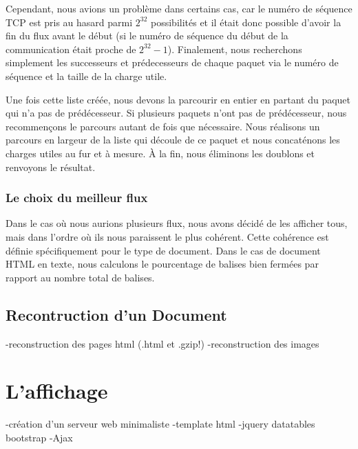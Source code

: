 Cependant, nous avions un problème dans certains cas, car le numéro de séquence TCP est pris au hasard parmi $2^{32}$ possibilités et il était donc possible d'avoir la fin du flux 
avant le début (si le numéro de séquence du début de la communication était proche de $2^{32} -1$). Finalement, nous recherchons simplement les successeurs et prédecesseurs de chaque
paquet via le numéro de séquence et la taille de la charge utile.

Une fois cette liste créée, nous devons la parcourir en entier en partant du paquet qui n'a pas de prédécesseur. Si plusieurs paquets n'ont pas de prédécesseur, nous recommençons le parcours autant de fois que nécessaire. Nous réalisons un parcours en largeur de la liste qui découle de ce paquet et nous concaténons les charges utiles au fur et à mesure. À la fin, nous éliminons
 les doublons et renvoyons le résultat.



\subsubsection{Le choix du meilleur flux}%
Dans le cas où nous aurions plusieurs flux, nous avons décidé de les afficher tous, mais dans l'ordre où ils nous paraissent le plus cohérent. Cette cohérence est définie spécifiquement 
pour le type de document. Dans le cas de document HTML en texte, nous calculons le pourcentage de balises bien fermées par rapport au nombre total de balises.

\subsection{Recontruction d'un Document}

-reconstruction des pages html (.html et .gzip!)
-reconstruction des images

\section{L'affichage}
-création d'un serveur web minimaliste
-template html
-jquery datatables bootstrap
-Ajax
